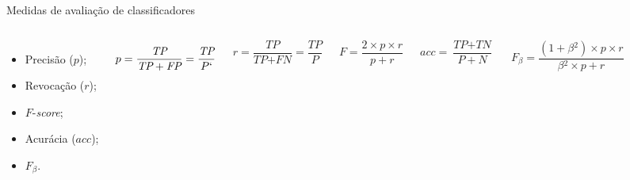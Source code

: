 \documentclass[%
  10pt,%
  aspectratio = 169,%
  compress,%
  t,%
]{beamer}%
\begin{document}
        \begin{frame}[fragile = singleslide]{}{Medidas de avaliação de classificadores}
        \begin{columns}[t]
            \begin{itemize}
                \item Precisão ($p$);
                
                \item Revocação ($r$);
                
                \item $F$-\textit{score};
                
                \item Acurácia ($acc$);
                
                \item $F_\beta{}$.
            \end{itemize}
            
            
            \begin{equation}
                \label{eq:medida-precisão}
        		p = 
        		\frac{\textit{TP}}{\textit{TP} + \textit{FP}}
        		= \frac{\textit{TP}}{P`}
            \end{equation}
            
            \begin{equation}
                \label{eq:medida-revocação}
        		r = 
        		\frac{\textit{TP}}{\textit{TP} + \textit{FN}}
        		= \frac{\textit{TP}}{P}
            \end{equation}
            
            \begin{equation}
                \label{eq:medida-f-score}
        		F = 
        		\frac{2 \times p \times r}{p + r}
            \end{equation}
            
            \begin{equation}
                \label{eq:medida-acurácia}
        		acc = 
        		\frac{\textit{TP} + \textit{TN}}{P + N}
            \end{equation}
            
            \begin{equation}
                \label{eq:medida-f-beta}
        		F_\beta{} = 
        		\frac{(1 + \beta{}^2) \times p \times r}{\beta{}^2 \times p + r}
            \end{equation}
        \end{columns}
    \end{frame}
    
\end{document}
